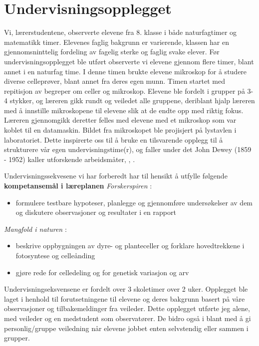 \documentclass[main.tex]{subfiles}
\begin{document}
\section*{Undervisningsopplegget}
\label{sec:1}

Vi, lærerstudentene, observerte elevene fra 8. klasse i både naturfagtimer og matematikk timer. 
Elevenes faglig bakgrunn er varierende, klassen har en gjennomsninttelig fordeling av fagelig 
sterke og faglig svake elever. Før undervisningsopplegget ble utført observerte vi elevene 
gjennom flere timer, blant annet i en naturfag time. I denne timen brukte elevene mikroskop 
for å studere diverse celleprøver, blant annet fra deres egen munn. Timen startet med 
repitisjon av begreper om celler og mikroskop. Elevene ble fordelt i grupper på 3-4 stykker, 
og læreren gikk rundt og veiledet alle gruppene, deriblant hjalp læreren med å innstille 
mikroskopene til elevene slik at de endte opp med riktig fokus. Læreren gjennomgikk deretter 
felles med elevene med et mikroskop som var koblet til en datamaskin. Bildet fra mikroskopet 
ble projisjert på lystavlen i laboratoriet. Dette inspirerte oss til å bruke en tilsvarende 
opplegg til å strukturere vår egen undervisningstime(r), og faller under det John Dewey (1859 - 
1952) kaller utforskende arbeidsmåter, , .

Undervisningssekvesene vi har forberedt har til hensikt å utfylle følgende \textbf{kompetansemål 
i læreplanen}
\newline
\newline
\emph{Forskerspiren} :
\begin{itemize}
\vspace{-2mm}
\item formulere testbare hypoteser, planlegge og gjennomføre undersøkelser 
av dem og diskutere observasjoner og resultater i en rapport
\end{itemize}
\emph{Mangfold i naturen} :
\begin{itemize}
\vspace{-2mm}
\item beskrive oppbygningen av dyre- og planteceller og forklare hovedtrekkene i fotosyntese 
og celleånding
\vspace{-5mm}
\item gjøre rede for celledeling og for genetisk variasjon og arv
\end{itemize}
Undervisningseksvensene er fordelt over 3 skoletimer over 2 uker. Opplegget ble laget i henhold
til forutsetningene til elevene og deres bakgrunn basert på våre observasjoner og 
tilbakemeldinger fra veileder. Dette opplegget utførte jeg alene, med veileder og en medstudent 
som observatører. De bidro også i blant med å gi personlig/gruppe veiledning når elevene jobbet
enten selvstendig eller sammen i grupper.
\end{document}
